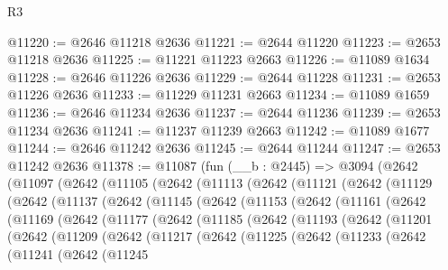 \begin{lexlean}{R3}
\begin{coremodule}
@11220 := @2646 @11218 @2636
@11221 := @2644 @11220
@11223 := @2653 @11218 @2636
@11225 := @11221 @11223 @2663
@11226 := @11089 @1634
@11228 := @2646 @11226 @2636
@11229 := @2644 @11228
@11231 := @2653 @11226 @2636
@11233 := @11229 @11231 @2663
@11234 := @11089 @1659
@11236 := @2646 @11234 @2636
@11237 := @2644 @11236
@11239 := @2653 @11234 @2636
@11241 := @11237 @11239 @2663
@11242 := @11089 @1677
@11244 := @2646 @11242 @2636
@11245 := @2644 @11244
@11247 := @2653 @11242 @2636
@11378 := @11087
    (fun (__b : @2445) =>
    @3094
      (@2642
        (@11097
          (@2642
            (@11105
              (@2642
                (@11113
                  (@2642
                    (@11121
                      (@2642
                        (@11129
                          (@2642
                            (@11137
                              (@2642
                                (@11145
                                  (@2642
                                    (@11153
                                      (@2642
                                        (@11161
                                          (@2642
                                            (@11169
                                              (@2642
                                                (@11177
                                                  (@2642
                                                    (@11185
                                                      (@2642
                                                        (@11193
                                                          (@2642
                                                            (@11201
                                                              (@2642
                                                                (@11209
                                                                  (@2642
                                                                    (@11217
                                                                      (@2642
                                                                        (@11225
                                                                          (@2642
                                                                            (@11233
                                                                              (@2642
                                                                                (@11241
                                                                                  (@2642
                                                                                    (@11245

\end{coremodule}
\end{lexlean}
